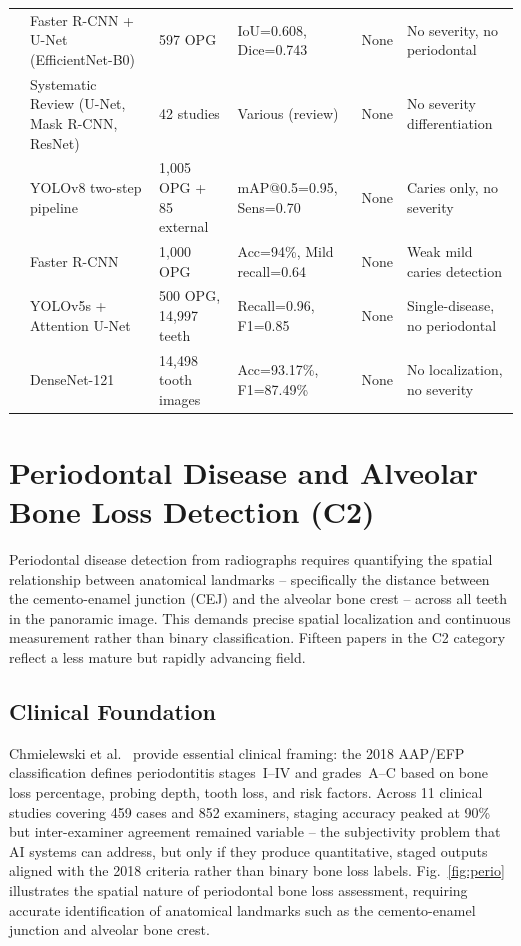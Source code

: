\documentclass[conference]{IEEEtran}
\begin{document}
\begin{table}[t]
\begin{tabular}{p{0.6cm} p{4.8cm} p{3.0cm} p{3.5cm} p{1.0cm} p{3.2cm}}
\cite{lim2024dual}          & Faster R-CNN + U-Net (EfficientNet-B0) & 597 OPG & IoU=0.608, Dice=0.743 & None & No severity, no periodontal \\
\cite{zanini2024systematic} & Systematic Review (U-Net, Mask R-CNN, ResNet) & 42 studies & Various (review) & None & No severity differentiation \\
\cite{bizjak2024advancing}  & YOLOv8 two-step pipeline & 1,005 OPG + 85 external & mAP@0.5=0.95, Sens=0.70 & None & Caries only, no severity \\
\cite{asadi2024detection}   & Faster R-CNN & 1,000 OPG & Acc=94\%, Mild recall=0.64 & None & Weak mild caries detection \\
\cite{pornprasertsuk2025clinical} & YOLOv5s + Attention U-Net & 500 OPG, 14,997 teeth & Recall=0.96, F1=0.85 & None & Single-disease, no periodontal \\
\cite{ozdemir2026enhanced}  & DenseNet-121 & 14,498 tooth images & Acc=93.17\%, F1=87.49\% & None & No localization, no severity \\
\bottomrule
\end{tabular}
\end{table}

\section{Periodontal Disease and Alveolar Bone Loss Detection (C2)}
\label{sec:perio}

Periodontal disease detection from radiographs requires quantifying the
spatial relationship between anatomical landmarks -- specifically the
distance between the cemento-enamel junction (CEJ) and the alveolar
bone crest -- across all teeth in the panoramic image. This demands
precise spatial localization and continuous measurement rather than
binary classification. Fifteen papers in the C2 category reflect a less
mature but rapidly advancing field.

\subsection{Clinical Foundation}

Chmielewski et al.~\cite{chmielewski20252018} provide essential clinical
framing: the 2018 AAP/EFP classification defines periodontitis
stages~I--IV and grades~A--C based on bone loss percentage, probing
depth, tooth loss, and risk factors. Across 11 clinical studies covering
459 cases and 852 examiners, staging accuracy peaked at 90\% but
inter-examiner agreement remained variable -- the subjectivity problem
that AI systems can address, but only if they produce quantitative,
staged outputs aligned with the 2018 criteria rather than binary bone
loss labels. Fig.~\ref{fig:perio} illustrates the spatial nature of periodontal bone loss assessment, requiring accurate identification of anatomical landmarks such as the cemento-enamel junction and alveolar bone crest.
\end{document}
